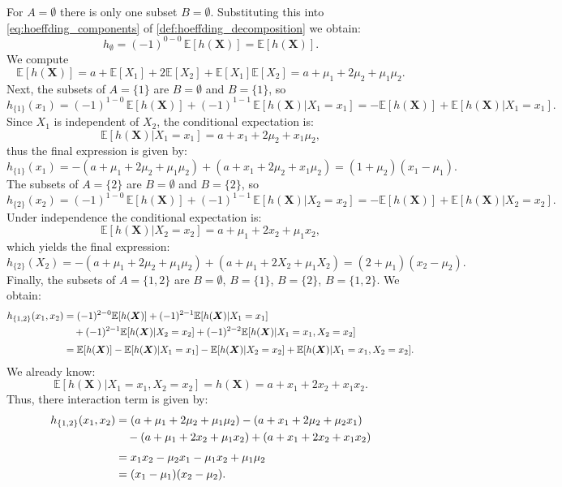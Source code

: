 For $A=\emptyset$ there is only one subset $B=\emptyset$. 
Substituting this into \autoref{eq:hoeffding_components} of \autoref{def:hoeffding_decomposition} we obtain:
\[
h_{\emptyset}
=
(-1)^{0-0}\,
\mathbb{E}[h(\boldsymbol{X})]
=
\mathbb{E}[h(\boldsymbol{X})].
\]
We compute
\[
\mathbb{E}[h(\boldsymbol{X})]
= a + \mathbb{E}[X_1] + 2 \mathbb{E}[X_2] 
  + \mathbb{E}[X_1]\mathbb{E}[X_2]
= a + \mu_1 + 2\mu_2 + \mu_1\mu_2.
\]
Next, the subsets of $A=\{1\}$ are $B=\emptyset$ and $B=\{1\}$, so
\[
h_{\{1\}}(x_1)
=
(-1)^{1-0}\,\mathbb{E}[h(\boldsymbol{X})]
+
(-1)^{1-1}\,\mathbb{E}[h(\boldsymbol{X})|X_1 = x_1]
=
-\mathbb{E}[h(\boldsymbol{X})] + \mathbb{E}[h(\boldsymbol{X})|X_1 = x_1].
\]
Since $X_1$ is independent of $X_2$, the conditional expectation is:
\[
\mathbb{E}[h(\boldsymbol{X})|X_1 = x_1]
= a + x_1 + 2\mu_2 + x_1 \mu_2,
\]
thus the final expression is given by:
\[
h_{\{1\}}(x_1)
= - (a+\mu_1+2\mu_2+\mu_1\mu_2) + (a+x_1+2\mu_2+x_1\mu_2)
= (1+\mu_2)(x_1 - \mu_1).
\]
The subsets of $A=\{2\}$ are $B=\emptyset$ and $B=\{2\}$, so
\[
h_{\{2\}}(x_2)
=
(-1)^{1-0}\,\mathbb{E}[h(\boldsymbol{X})]
+
(-1)^{1-1}\,\mathbb{E}[h(\boldsymbol{X})|X_2 = x_2]
=
-\mathbb{E}[h(\boldsymbol{X})] + \mathbb{E}[h(\boldsymbol{X})|X_2 = x_2].
\]
Under independence the conditional expectation is:
\[
\mathbb{E}[h(\boldsymbol{X})|X_2 = x_2]
= a + \mu_1 + 2x_2 + \mu_1 x_2,
\]
which yields the final expression:
\[
h_{\{2\}}(X_2)
= - (a+\mu_1+2\mu_2+\mu_1\mu_2) + (a+\mu_1+2X_2+\mu_1 X_2)
= (2+\mu_1)(x_2 - \mu_2).
\]
Finally, the subsets of $A=\{1,2\}$ are 
$B=\emptyset$, $B=\{1\}$, $B=\{2\}$, $B=\{1,2\}$. 
We obtain:
\begin{align*}
h_{\{1,2\}}(x_1,x_2)
&= (-1)^{2-0}\mathbb{E}[h(\boldsymbol{X})]
   + (-1)^{2-1}\mathbb{E}[h(\boldsymbol{X})|X_1 = x_1] \notag\\
&\quad + (-1)^{2-1}\mathbb{E}[h(\boldsymbol{X})|X_2 = x_2]
   + (-1)^{2-2}\mathbb{E}[h(\boldsymbol{X})|X_1 = x_1,X_2 = x_2] \notag\\[0.3em]
&= \mathbb{E}[h(\boldsymbol{X})]
   - \mathbb{E}[h(\boldsymbol{X})|X_1 = x_1]
   - \mathbb{E}[h(\boldsymbol{X})|X_2 = x_2]
   + \mathbb{E}[h(\boldsymbol{X})|X_1 = x_1,X_2 = x_2].
\end{align*}
We already know:
\[
\mathbb{E}[h(\boldsymbol{X})|X_1 = x_1,X_2 = x_2] = h(\boldsymbol{X}) = a + x_1 + 2x_2 + x_1 x_2.
\]
Thus, there interaction term is given by:
\begin{align}
h_{\{1,2\}}(x_1,x_2)
&= (a+\mu_1+2\mu_2+\mu_1\mu_2)
   - (a+x_1+2\mu_2+\mu_2 x_1) \notag\\
&\quad - (a+\mu_1+2x_2+\mu_1 x_2)
   + (a+x_1+2x_2+x_1 x_2) \notag\\[0.3em]
&= x_1 x_2 - \mu_2 x_1 - \mu_1 x_2 + \mu_1 \mu_2 \notag\\
&= (x_1 - \mu_1)(x_2 - \mu_2).
\end{align}
